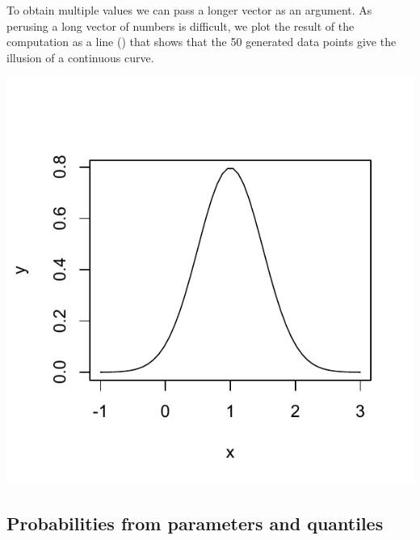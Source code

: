 \documentclass[krantz2]{krantz}\usepackage{knitr}
\begin{document}
To obtain multiple values we can pass a longer vector as an argument. As perusing a long vector of numbers is difficult, we plot the result of the computation as a line () that shows that the 50 generated data points give the illusion of a continuous curve.

\begin{knitrout}\footnotesize
{}\color{fgcolor}\begin{kframe}
\begin{alltt}
 \hlkwb{<-} \hlstd{(} \hlstd{=} \hlopt{-}\hlstd{,}  \hlstd{=} \hlstd{,}  \hlstd{=} \hlstd{)}

 \hlkwb{<-} \hlstd{(} 
                       \hlstd{=} \hlstd{(}   \hlstd{=} \hlstd{,}  \hlstd{=} \hlstd{))}
\hlopt{~}    \hlstd{=} \hlstd{)}
\end{alltt}
\end{kframe}

{\centering \includegraphics[width=.54\textwidth]{figure/pos-distrib-01a-1}

}



\end{knitrout}

\subsection{Probabilities from parameters and quantiles}\label{sec:prob:quant}
\end{document}
